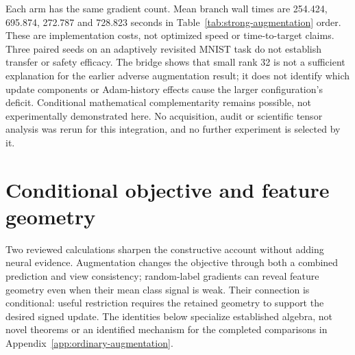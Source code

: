 \documentclass[10pt]{article}
\begin{document}
Each arm has the same gradient count. Mean branch wall times are 254.424, 695.874, 272.787 and 728.823 seconds in Table~\ref{tab:strong-augmentation} order. These are implementation costs, not optimized speed or time-to-target claims. Three paired seeds on an adaptively revisited MNIST task do not establish transfer or safety efficacy. The bridge shows that small rank 32 is not a sufficient explanation for the earlier adverse augmentation result; it does not identify which update components or Adam-history effects cause the larger configuration's deficit. Conditional mathematical complementarity remains possible, not experimentally demonstrated here. No acquisition, audit or scientific tensor analysis was rerun for this integration, and no further experiment is selected by it.

\clearpage
\section{Conditional objective and feature geometry}\label{app:conditional-geometry}
Two reviewed calculations sharpen the constructive account without adding neural evidence. Augmentation changes the objective through both a combined prediction and view consistency; random-label gradients can reveal feature geometry even when their mean class signal is weak. Their connection is conditional: useful restriction requires the retained geometry to support the desired signed update. The identities below specialize established algebra, not novel theorems or an identified mechanism for the completed comparisons in Appendix~\ref{app:ordinary-augmentation}.
\end{document}
